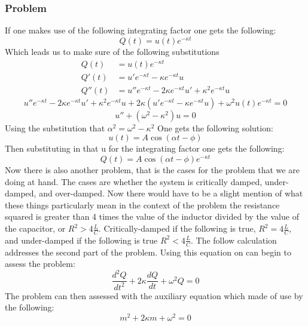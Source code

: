 \documentclass[11pt]{article} %
\begin{document}
\subsubsection{Problem}
If one makes use of the following integrating factor one gets the following: \begin{equation*}Q(t)=u(t)e^{-\kappa t} \end{equation*} Which leads us to make sure of the following substitutions \begin{align*}Q(t)&=u(t)e^{-\kappa t} \\ Q'(t)&= u'e^{-\kappa t}-\kappa e^{-\kappa t} u \\ Q''(t)&= u''e^{-\kappa t}- 2\kappa e^{-\kappa t} u'+\kappa^2 e^{-\kappa t} u \end{align*} \begin{equation*} u''e^{-\kappa t}- 2\kappa e^{-\kappa t} u'+\kappa^2 e^{-\kappa t} u+2\kappa (u'e^{-\kappa t}-\kappa e^{-\kappa t} u)+\omega^2 u(t)e^{-\kappa t}=0\end{equation*} \begin{equation*} u''+(\omega^2-\kappa^2)u=0\end{equation*} Using the substitution that $\alpha^2 =\omega^2-\kappa^2$ One gets the following solution: \begin{equation*} u(t)= A\cos(\alpha t-\phi)\end{equation*} Then substituting in that u for the integrating factor one gets the following: \begin{equation}Q(t)=A\cos(\alpha t-\phi) e^{-\kappa t} \end{equation}
Now there is also another problem, that is the cases for the problem that we are doing at hand. The cases are whether the system is critically damped, under-damped, and over-damped. Now there would have to be a slight mention of what these things particularly mean in the context of the problem the resistance squared is greater than 4 times  the value of the inductor divided by the value of the capacitor, or $R^2>4\frac{L}{C}$. Critically-damped if the following is true, $R^2=4\frac{L}{C}$, and under-damped if the following is true $R^2<4\frac{L}{C}$. The follow calculation addresses the second part of the problem. Using this equation on can begin to assess the problem: \begin{equation*}
\frac{d^2Q}{dt^2}+2\kappa\frac{dQ}{dt}+\omega^2{Q} =0
\end{equation*} The problem can then assessed with the auxiliary equation which made of use by the following: \begin{equation*}
m^2+2\kappa m+ \omega^2 = 0
\end{equation*}
\end{document}
